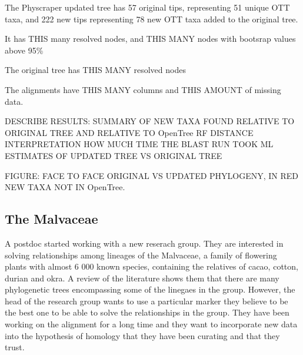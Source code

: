 \documentclass[]{article}
\begin{document}
The Physcraper updated tree has 57 original tips, representing 51 unique OTT taxa, and 222 new tips representing 78 new OTT taxa added to the original tree.

It has THIS many resolved nodes, and THIS MANY nodes with bootsrap values above 95\%

The original tree has THIS MANY resolved nodes

The alignments have THIS MANY columns and THIS AMOUNT of missing data.

DESCRIBE RESULTS: SUMMARY OF NEW TAXA FOUND RELATIVE TO ORIGINAL TREE AND RELATIVE TO OpenTree
RF DISTANCE INTERPRETATION
HOW MUCH TIME THE BLAST RUN TOOK
ML ESTIMATES OF UPDATED TREE VS ORIGINAL TREE

FIGURE: FACE TO FACE ORIGINAL VS UPDATED PHYLOGENY, IN RED NEW TAXA NOT IN OpenTree.

\hypertarget{the-malvaceae}{%
\subsection{The Malvaceae}\label{the-malvaceae}}

A postdoc started working with a new reserach group. They are interested in solving relationships among lineages of the Malvaceae, a family of flowering plants with almost 6 000 known species, containing the relatives of cacao, cotton, durian and okra.
A review of the literature shows them that there are many phylogenetic trees encompassing some of the linegaes in the group. However, the head of the research group wants to use a particular marker they believe to be the best one to be able to solve the relationships in the group. They have been working on the alignment for a long time and they want to incorporate new data into the hypothesis of homology that they have been curating and that they trust.
\end{document}
